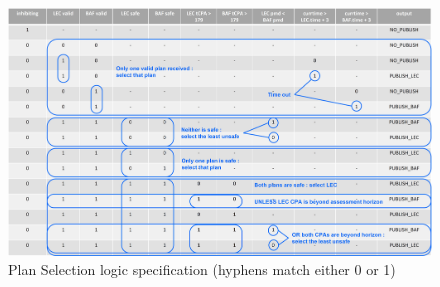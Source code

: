 
\begin{figure}
	\centering
	\includegraphics[width=\textwidth]{figures/selection-logic.jpg}
	\caption{Plan Selection logic specification (hyphens match either 0 or 1)}
	\label{fig:selection-logic}
\end{figure}
